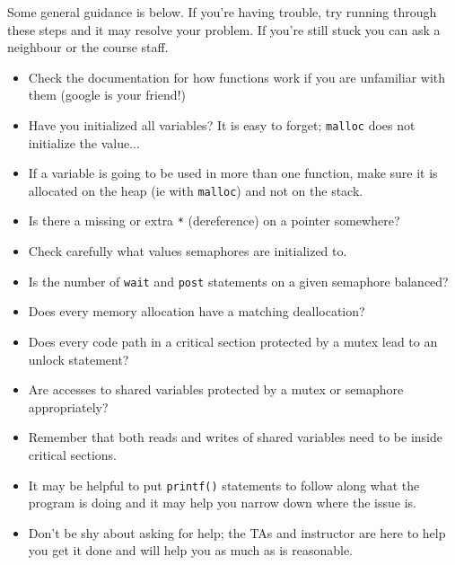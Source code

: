 Some general guidance is below. If you're having trouble, try running through these steps and it may resolve your problem. If you're still stuck you can ask a neighbour or the course staff.
\begin{itemize}
	\item Check the documentation for how functions work if you are unfamiliar with them (google is your friend!)
	\item Have you initialized all variables? It is easy to forget; \texttt{malloc} does not initialize the value...
	\item If a variable is going to be used in more than one function, make sure it is allocated on the heap (ie with \texttt{malloc}) and not on the stack.
	\item Is there a missing or extra \texttt{*} (dereference) on a pointer somewhere?
	\item Check carefully what values semaphores are initialized to.
	\item Is the number of \texttt{wait} and \texttt{post} statements on a given semaphore balanced?
	\item Does every memory allocation have a matching deallocation?
	\item Does every code path in a critical section protected by a mutex lead to an unlock statement?
	\item Are accesses to shared variables protected by a mutex or semaphore appropriately?
	\item Remember that both reads and writes of shared variables need to be inside critical sections.
	\item It may be helpful to put \texttt{printf()} statements to follow along what the program is doing and it may help you narrow down where the issue is.
	\item Don't be shy about asking for help; the TAs and instructor are here to help you get it done and will help you as much as is reasonable.
\end{itemize}



